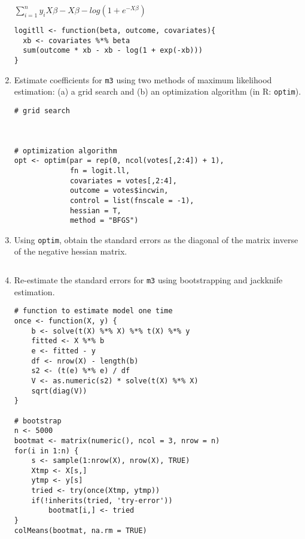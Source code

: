 \documentclass[a4paper,11pt]{article}
\begin{document}
\begin{enumerate}
$\sum_{i=1}^{n} y_i X\beta - X\beta - log(1 + e^{-X \beta})$

\begin{solution}
\begin{lstlisting}
logitll <- function(beta, outcome, covariates){
  xb <- covariates %*% beta
  sum(outcome * xb - xb - log(1 + exp(-xb)))
}
\end{lstlisting}
\end{solution}


\item Estimate coefficients for \texttt{m3} using two methods of maximum likelihood estimation: (a) a grid search and (b) an optimization algorithm (in R: \texttt{optim}).

\begin{solution}
\begin{lstlisting}
# grid search



# optimization algorithm
opt <- optim(par = rep(0, ncol(votes[,2:4]) + 1),
             fn = logit.ll,
             covariates = votes[,2:4],
             outcome = votes$incwin,
             control = list(fnscale = -1),
             hessian = T,
             method = "BFGS")
\end{lstlisting}
\end{solution}

\item Using \texttt{optim}, obtain the standard errors as the diagonal of the matrix inverse of the negative hessian matrix.

\begin{solution}
\begin{lstlisting}

\end{lstlisting}
\end{solution}


\item Re-estimate the standard errors for \texttt{m3} using bootstrapping and jackknife estimation.

\begin{solution}
\begin{lstlisting}
# function to estimate model one time
once <- function(X, y) {
    b <- solve(t(X) %*% X) %*% t(X) %*% y
    fitted <- X %*% b
    e <- fitted - y
    df <- nrow(X) - length(b)
    s2 <- (t(e) %*% e) / df
    V <- as.numeric(s2) * solve(t(X) %*% X)
    sqrt(diag(V))
}

# bootstrap
n <- 5000
bootmat <- matrix(numeric(), ncol = 3, nrow = n)
for(i in 1:n) {
    s <- sample(1:nrow(X), nrow(X), TRUE)
    Xtmp <- X[s,]
    ytmp <- y[s]
    tried <- try(once(Xtmp, ytmp))
    if(!inherits(tried, 'try-error'))
        bootmat[i,] <- tried
}
colMeans(bootmat, na.rm = TRUE)


\end{lstlisting}
\end{solution}
\end{enumerate}
\end{document}
